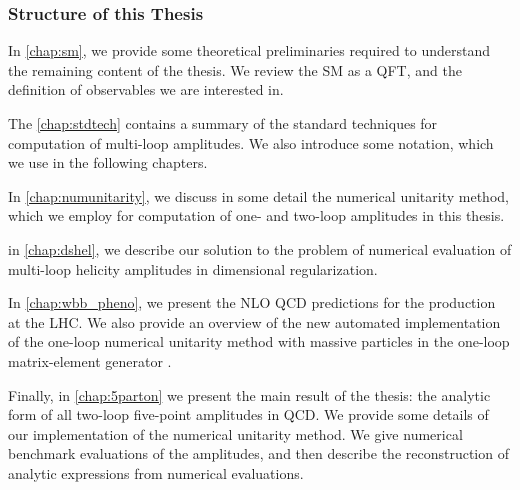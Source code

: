 \subsubsection{Structure of this Thesis}

In \cref{chap:sm}, we provide some theoretical preliminaries required to understand the remaining 
content of the thesis.
We review the SM as a QFT, and  the definition of observables we are interested in.

The \cref{chap:stdtech} contains a summary of the standard techniques for computation of multi-loop amplitudes.
We also introduce some notation, which we use in the following chapters.

In \cref{chap:numunitarity}, we discuss in some detail the numerical unitarity method, which we employ for computation
of one- and two-loop amplitudes in this thesis.

in \cref{chap:dshel}, we describe our solution to the problem of numerical evaluation of multi-loop helicity amplitudes in dimensional regularization.

In \cref{chap:wbb_pheno}, we present the NLO QCD predictions for the \Wbbn{} production at the LHC.
We also provide an overview of the new automated implementation of the one-loop numerical unitarity method with massive particles in the one-loop matrix-element generator \BlackHat{}.

Finally, in \cref{chap:5parton} we present the main result of the thesis: the analytic form of all two-loop five-point amplitudes in QCD.
We provide some details of our implementation of the numerical unitarity method.
We give numerical benchmark evaluations of the amplitudes, 
and then describe the reconstruction of analytic expressions from numerical evaluations.
